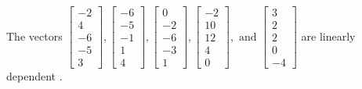 \begin{exercise}
\begin{exerciseStatement}
  \end{exerciseStatement}
  \begin{exerciseAnswer}
   The vectors \(\left[\begin{array}{r}
-2 \\
4 \\
-6 \\
-5 \\
3
\end{array}\right] , \left[\begin{array}{r}
-6 \\
-5 \\
-1 \\
1 \\
4
\end{array}\right] , \left[\begin{array}{r}
0 \\
-2 \\
-6 \\
-3 \\
1
\end{array}\right] , \left[\begin{array}{r}
-2 \\
10 \\
12 \\
4 \\
0
\end{array}\right] , \text{ and } \left[\begin{array}{r}
3 \\
2 \\
2 \\
0 \\
-4
\end{array}\right]\) are 
  	 linearly dependent  .
  


  \end{exerciseAnswer}
\end{exercise}